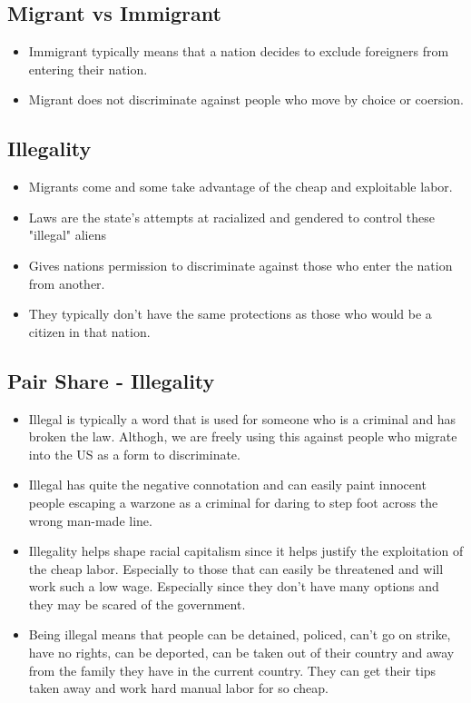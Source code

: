 \documentclass{article}
\begin{document}
\subsection{Migrant vs Immigrant}
\begin{itemize}
  \item Immigrant typically means that a nation decides
    to exclude foreigners from entering their nation.
  \item Migrant does not discriminate against people
    who move by choice or coersion.
\end{itemize}

\subsection{Illegality}
\begin{itemize}
  \item Migrants come and some take advantage of the cheap
    and exploitable labor.
  \item Laws are the state's attempts at racialized and
    gendered to control these "illegal" aliens
  \item Gives nations permission to discriminate against
    those who enter the nation from another.
  \item They typically don't have the same protections as those
    who would be a citizen in that nation.
\end{itemize}

\subsection{Pair Share - Illegality}
\begin{itemize}
  \item Illegal is typically a word that is used for someone
    who is a criminal and has broken the law.
    Althogh, we are freely using this against people who migrate into
    the US as a form to discriminate.
  \item Illegal has quite the negative connotation and can easily
    paint innocent people escaping a warzone as a criminal for
    daring to step foot across the wrong man-made line.
  \item Illegality helps shape racial capitalism since it
    helps justify the exploitation of the cheap labor.
    Especially to those that can easily be threatened and will work
    such a low wage. Especially since they don't have many options
    and they may be scared of the government.
  \item Being illegal means that people can be detained, policed,
    can't go on strike, have no rights,
    can be deported, can be taken out of their country
    and away from the family they have in the current country.
    They can get their tips taken away and work hard manual labor
    for so cheap.

\end{itemize}
\end{document}
